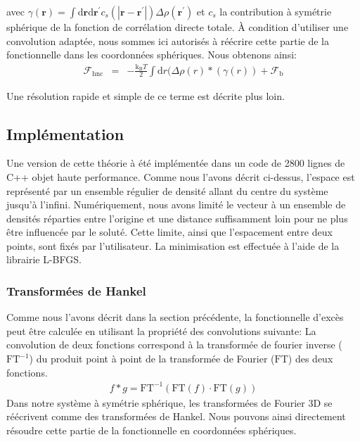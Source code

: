  avec $\gamma(\boldsymbol{r}) = \int\mathrm{d}\boldsymbol{r}\mathrm{d}\boldsymbol{r}^\prime c_s\left(\left|\boldsymbol{r}-\boldsymbol{r}^\prime\right| \right) \Delta\rho\left(\boldsymbol{r}^\prime  \right)$ et $c_s$ la contribution à symétrie sphérique de la fonction de corrélation directe totale. À condition d'utiliser une convolution adaptée, nous sommes ici autorisés à réécrire cette partie de la fonctionnelle dans les coordonnées sphériques. Nous obtenons ainsi:
\begin{eqnarray}
\mathcal{F}_\mathrm{hnc} &=& -\frac{\mathrm{k_B}T}{2} \int \mathrm{d} r (\Delta\rho\left(r \right)  \ast (\gamma(r)) + \mathcal{F}_\mathrm{b}
\end{eqnarray}

Une résolution rapide et simple de ce terme est décrite plus loin.




\subsection{Implémentation}
Une version de cette théorie à été implémentée dans un code de 2800 lignes de C++ objet haute performance. Comme nous l'avons décrit ci-dessus, l'espace est représenté par un ensemble régulier de densité allant du centre du système jusqu'à l'infini. Numériquement, nous avons limité le vecteur à un ensemble de densités réparties entre l'origine et une distance suffisamment loin pour ne plus être influencée par le soluté. Cette limite, ainsi que l'espacement entre deux points, sont fixés par l'utilisateur.
La minimisation est effectuée à l'aide de la librairie L-BFGS\cite{zhu_algorithm_1997}.

\subsubsection{Transformées de Hankel}
Comme nous l'avons décrit dans la section précédente, la fonctionnelle d'excès peut être calculée en utilisant la propriété des convolutions suivante: La convolution de deux fonctions correspond à la transformée de fourier inverse ($\mathrm{FT}^{-1}$) du produit point à point de la transformée de Fourier ($\mathrm{FT}$) des deux fonctions.
\begin{eqnarray}
f \ast g  = \mathrm{FT}^{-1}(\mathrm{FT}(f)\cdot\mathrm{FT}(g))
\end{eqnarray}
Dans notre système à symétrie sphérique, les transformées de Fourier 3D se réécrivent comme des transformées de Hankel. Nous pouvons ainsi directement résoudre cette partie de la fonctionnelle en coordonnées sphériques.



